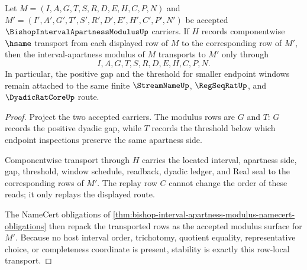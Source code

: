 \begin{theorem}
\label{thm:bishop-interval-apartness-modulus-stability}
Let $M=(I,A,G,T,S,R,D,E,H,C,P,N)$ and $M'=(I',A',G',T',S',R',D',E',H',C',P',N')$ be accepted $\BishopIntervalApartnessModulusUp$ carriers. If $H$ records componentwise $\hsame$ transport from each displayed row of $M$ to the corresponding row of $M'$, then the interval-apartness modulus of $M$ transports to $M'$ only through
$$
I,A,G,T,S,R,D,E,H,C,P,N .
$$
In particular, the positive gap and the threshold for smaller endpoint windows remain attached to the same finite $\StreamNameUp$, $\RegSeqRatUp$, and $\DyadicRatCoreUp$ route.
\end{theorem}
\begin{proof}
Project the two accepted carriers. The modulus rows are $G$ and $T$: $G$ records the positive dyadic gap, while $T$ records the threshold below which endpoint inspections preserve the same apartness side.

Componentwise transport through $H$ carries the located interval, apartness side, gap, threshold, window schedule, readback, dyadic ledger, and Real seal to the corresponding rows of $M'$. The replay row $C$ cannot change the order of these reads; it only replays the displayed route.

The NameCert obligations of \autoref{thm:bishop-interval-apartness-modulus-namecert-obligations} then repack the transported rows as the accepted modulus surface for $M'$. Because no host interval order, trichotomy, quotient equality, representative choice, or completeness coordinate is present, stability is exactly this row-local transport.
\end{proof}


